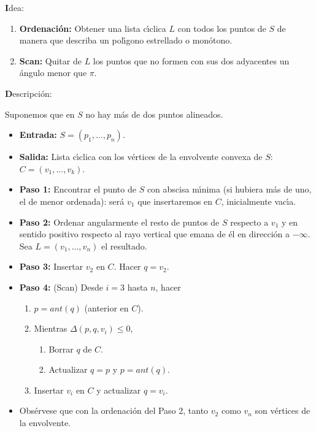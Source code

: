 \documentclass[ebook,oneside]{memoir}
\begin{document}
{\textbf Idea:}

\begin{enumerate}
  \item \textbf{Ordenaci\'{o}n:} Obtener una lista c\'{\i}clica $L$ con todos los puntos de
$S$ de manera que describa un pol\'{\i}gono estrellado o mon\'{o}tono.
  \item \textbf{Scan:} Quitar de $L$ los puntos que no formen con sus dos
adyacentes un \'{a}ngulo menor que $\pi$.
\end{enumerate}


{\textbf Descripci\'{o}n:}

Suponemos que en $S$ no hay m\'{a}s de dos puntos alineados.

\begin{itemize}
  \item\textbf{Entrada:} $S=(p_1,\dots,p_n)$.
  \item\textbf{Salida:} Lista c\'{\i}clica con los v\'{e}rtices de la envolvente
convexa de $S$: $C=(v_1,\dots,v_k)$.
  \item\textbf{Paso 1:} Encontrar el punto de $S$ con abscisa m\'{\i}nima (si
hubiera m\'{a}s de uno, el de menor ordenada): ser\'{a} $v_1$ que
insertaremos en $C$, inicialmente vac\'{\i}a.
  \item\textbf{Paso 2:} Ordenar angularmente el resto de puntos de $S$
res\-pec\-to a $v_1$ y en sentido positivo respecto al rayo
vertical que emana de \'{e}l en direcci\'{o}n a $-\infty$. Sea
$L=(v_1,\dots,v_n)$ el resultado.
  \item\textbf{Paso 3:} Insertar $v_2$ en $C$. Hacer $q=v_2$.
  \item\textbf{Paso 4:} (Scan) Desde $i=3$ hasta $n$, hacer
\begin{enumerate}
  \item $p=ant(q)$ (anterior en $C$).
  \item Mientras $\Delta(p,q,v_i) \leq 0$,
\begin{enumerate}
  \item Borrar $q$ de $C$.
  \item Actualizar $q=p$ y $p=ant(q)$.
\end{enumerate}
  \item Insertar $v_i$ en $C$ y actualizar $q=v_i$.
\end{enumerate}
\end{itemize}

\begin{itemize}
  \item Obs\'{e}rvese que con la ordenaci\'{o}n del Paso 2, tanto $v_2$ como
$v_n$ son v\'{e}rtices de la envolvente.
\end{itemize}
\vspace{0.2cm}
\end{document}

